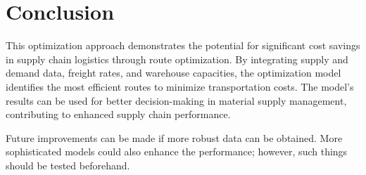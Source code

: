\documentclass{article}
\begin{document}
\section{Conclusion}

This optimization approach demonstrates the potential for significant cost savings in supply chain logistics through route optimization. By integrating supply and demand data, freight rates, and warehouse capacities, the optimization model identifies the most efficient routes to minimize transportation costs. The model's results can be used for better decision-making in material supply management, contributing to enhanced supply chain performance.

Future improvements can be made if more robust data can be obtained. More sophisticated models could also enhance the performance; however, such things should be tested beforehand.
\end{document}
